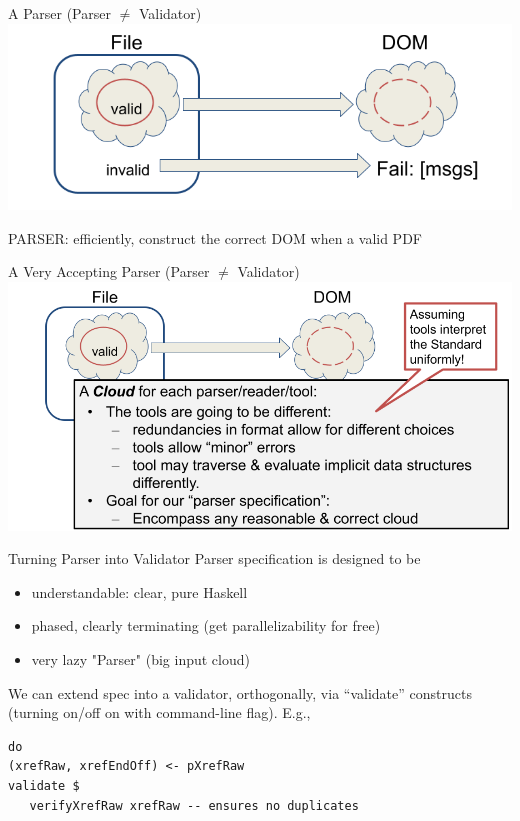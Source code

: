\documentclass[t,10pt,xcolor={dvipsnames}]{beamer}
\begin{document}
\begin{frame}[label={sec:org9d6fb3c}]{A Parser (Parser \(\neq\) Validator)}
\vspace{10pt}
\includegraphics[width=0.80\linewidth]{images/pNEQv-2.png}
\vfill

PARSER: efficiently, construct the correct DOM when a valid PDF
\end{frame}

\begin{frame}[label={sec:org7d79748}]{A Very Accepting Parser (Parser \(\neq\) Validator)}
\vspace{10pt}
\includegraphics[width=0.95\linewidth]{images/pNEQv-3.png}
\end{frame}

\begin{frame}[label={sec:orgcfc1e0a},fragile]{Turning Parser into Validator}
 Parser specification is designed to be
\begin{itemize}
\item understandable: clear, pure Haskell
\item phased, clearly terminating (get parallelizability for free)
\item very lazy "Parser" (big input cloud)
\end{itemize}

We can extend spec into a validator, orthogonally, via “validate” constructs
(turning on/off on with command-line flag).  E.g.,
\lstset{language=haskell,label= ,caption= ,captionpos=b,numbers=none}
\begin{lstlisting}
do
(xrefRaw, xrefEndOff) <- pXrefRaw
validate $
   verifyXrefRaw xrefRaw -- ensures no duplicates
\end{lstlisting}
\end{frame}
\end{document}
